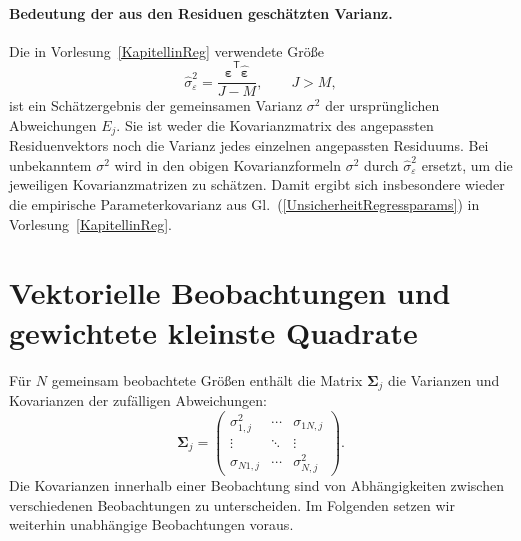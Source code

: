 \paragraph{Bedeutung der aus den Residuen geschätzten Varianz.}
Die in Vorlesung~\ref{KapitellinReg} verwendete Größe
\begin{equation}
\widehat\sigma_\varepsilon^2
=\frac{\widehat{\boldsymbol\varepsilon}^\mathsf T
\widehat{\boldsymbol\varepsilon}}{J-M},\qquad J>M,
\end{equation}
ist ein Schätzergebnis der gemeinsamen Varianz $\sigma^2$ der ursprünglichen
Abweichungen $E_j$. Sie ist weder die Kovarianzmatrix des angepassten
Residuenvektors noch die Varianz jedes einzelnen angepassten Residuums.
Bei unbekanntem $\sigma^2$ wird in den obigen Kovarianzformeln
$\sigma^2$ durch $\widehat\sigma_\varepsilon^2$ ersetzt, um die jeweiligen
Kovarianzmatrizen zu schätzen. Damit ergibt sich insbesondere wieder
die empirische Parameterkovarianz aus
Gl.~(\ref{UnsicherheitRegressparams}) in Vorlesung~\ref{KapitellinReg}.

\section{Vektorielle Beobachtungen und gewichtete kleinste Quadrate}
\label{V4VektorLikelihood}

Für $N$ gemeinsam beobachtete Größen enthält die Matrix
$\boldsymbol{\Sigma}_j$ die Varianzen und Kovarianzen der zufälligen Abweichungen:
\begin{equation}
\boldsymbol{\Sigma}_j=
\begin{pmatrix}
\sigma_{1,j}^2 & \cdots & \sigma_{1N,j}\\
\vdots & \ddots & \vdots\\
\sigma_{N1,j} & \cdots & \sigma_{N,j}^2
\end{pmatrix}.
\end{equation}
Die Kovarianzen innerhalb einer Beobachtung sind von Abhängigkeiten
zwischen verschiedenen Beobachtungen zu unterscheiden.
Im Folgenden setzen wir weiterhin unabhängige Beobachtungen voraus.

